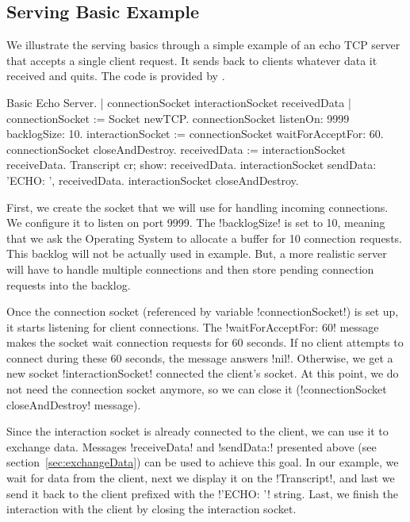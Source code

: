 \documentclass[a4paper,10pt,twoside]{book}
\begin{document}
\subsection{Serving Basic Example}
We illustrate the serving basics through a simple example of an echo TCP server that accepts a single client request.
It sends back to clients whatever data it received and quits.
The code is provided by .

\begin{script}[servingBasicExample]{Basic Echo Server.}
| connectionSocket interactionSocket receivedData |
connectionSocket := Socket newTCP.
connectionSocket listenOn: 9999 backlogSize: 10.
interactionSocket := connectionSocket waitForAcceptFor: 60.
connectionSocket closeAndDestroy.
receivedData := interactionSocket receiveData.
Transcript cr; show: receivedData.
interactionSocket sendData: 'ECHO: ', receivedData.
interactionSocket closeAndDestroy.
\end{script}

First, we create the socket that we will use for handling incoming connections.
We configure it to listen on port 9999.
The \ct!backlogSize! is set to 10, meaning that we ask the Operating System to allocate a buffer for 10 connection requests. 
This backlog will not be actually used in  example.
But, a more realistic server will have to handle multiple connections and then store pending connection requests into the backlog.

Once the connection socket (referenced by variable \ct!connectionSocket!) is set up, it starts listening for client connections.
The \ct!waitForAcceptFor: 60! message makes the socket wait connection requests for 60 seconds.
If no client attempts to connect during these 60 seconds, the message answers \ct!nil!.
Otherwise, we get a new socket \ct!interactionSocket! connected the client's socket.
At this point, we do not need the connection socket anymore, so we can close it (\ct!connectionSocket closeAndDestroy! message).

Since the interaction socket is already connected to the client, we can use it to exchange data.
Messages \ct!receiveData! and \ct!sendData:! presented above (see section~\ref{sec:exchangeData}) can be used to achieve this goal.
In our example, we wait for data from the client, next we display it on the \ct!Transcript!, and last we send it back to the client prefixed with the \ct!'ECHO: '! string.
Last, we finish the interaction with the client by closing the interaction socket.
\end{document}
